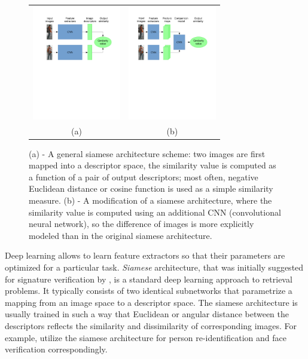 \begin{figure}
\begin{tabular}{cc}
\includegraphics[width=0.47\linewidth, height=5cm]{Figures/siamese.pdf}&
\includegraphics[width=0.50\linewidth, height=5cm]{Figures/siamese2.pdf}&
\\
(a) & (b)
\end{tabular}

\caption{(a) - A general siamese architecture \citep{Bromley93, Chopra05} scheme: two images are first mapped into a descriptor space, the similarity value is computed as a function of a pair of output descriptors; most often, negative Euclidean distance or cosine function is used as a simple similarity measure. (b) - A modification of a siamese architecture, where the similarity value is computed using an additional CNN (convolutional neural network), so the difference of images is  more explicitly modeled than in the original siamese architecture.}
\label{fig:siamese}

\end{figure}

Deep learning allows to learn feature extractors so that their parameters are optimized for a particular task. 
\textit{Siamese} architecture, that was initially suggested for signature verification by \citep{Bromley93}, is a standard deep learning approach to retrieval problems. It typically consists of two identical subnetworks that parametrize a mapping from an image space to a descriptor space. The siamese architecture is usually trained in such a way that Euclidean or angular distance between the descriptors reflects the similarity and dissimilarity of corresponding images.
For example, \citep{Yi14, parkhi2015deep} utilize the siamese architecture for person re-identification and face verification correspondingly.

